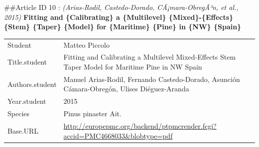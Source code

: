 \documentclass[]{article}
\begin{document}
\#\#Article ID 10 : \emph{(Arias-Rodil, Castedo-Dorado,
CÃ¡mara-ObregÃ³n, et al., 2015)} \textbf{Fitting and \{Calibrating\} a
\{Multilevel\} \{Mixed\}-\{Effects\} \{Stem\} \{Taper\} \{Model\} for
\{Maritime\} \{Pine\} in \{NW\} \{Spain\}}

\begin{longtable}[]{@{}ll@{}}
\toprule
\endhead
\begin{minipage}[t]{0.21\columnwidth}\raggedright
Student\strut
\end{minipage} & \begin{minipage}[t]{0.73\columnwidth}\raggedright
Matteo Piccolo\strut
\end{minipage}\tabularnewline
\begin{minipage}[t]{0.21\columnwidth}\raggedright
Title.student\strut
\end{minipage} & \begin{minipage}[t]{0.73\columnwidth}\raggedright
Fitting and Calibrating a Multilevel Mixed-Effects Stem Taper Model for
Maritime Pine in NW Spain\strut
\end{minipage}\tabularnewline
\begin{minipage}[t]{0.21\columnwidth}\raggedright
Authors.student\strut
\end{minipage} & \begin{minipage}[t]{0.73\columnwidth}\raggedright
Manuel Arias-Rodil, Fernando Castedo-Dorado, Asunción Cámara-Obregón,
Ulises Diéguez-Aranda\strut
\end{minipage}\tabularnewline
\begin{minipage}[t]{0.21\columnwidth}\raggedright
Year.student\strut
\end{minipage} & \begin{minipage}[t]{0.73\columnwidth}\raggedright
2015\strut
\end{minipage}\tabularnewline
\begin{minipage}[t]{0.21\columnwidth}\raggedright
Species\strut
\end{minipage} & \begin{minipage}[t]{0.73\columnwidth}\raggedright
Pinus pinaster Ait.\strut
\end{minipage}\tabularnewline
\begin{minipage}[t]{0.21\columnwidth}\raggedright
Base.URL\strut
\end{minipage} & \begin{minipage}[t]{0.73\columnwidth}\raggedright
\url{http://europepmc.org/backend/ptpmcrender.fcgi?accid=PMC4668033\&blobtype=pdf}\strut
\end{minipage}\tabularnewline

\end{longtable}
\end{document}
